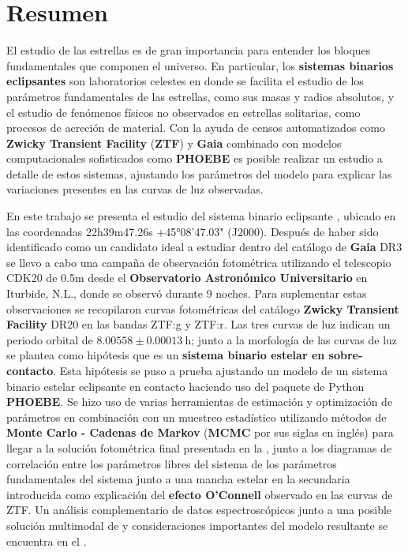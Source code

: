 \chapter*{Resumen}

El estudio de las estrellas es de gran importancia para entender los bloques
fundamentales que componen el universo. En particular, los \textbf{sistemas
binarios eclipsantes} son laboratorios celestes en donde se facilita el estudio
de los parámetros fundamentales de las estrellas, como sus masas y radios
absolutos, y el estudio de fenómenos físicos no observados en estrellas
solitarias, como procesos de acreción de material. Con la ayuda de censos
automatizados como \textbf{Zwicky Transient Facility} (\textbf{ZTF}) y
\textbf{Gaia} combinado con modelos computacionales sofisticados como
\textbf{PHOEBE} es posible realizar un estudio a detalle de estos sistemas,
ajustando los parámetros del modelo para explicar las variaciones presentes en
las curvas de luz observadas. 

En este trabajo se presenta el estudio del sistema binario eclipsante
\textbf{\atoObjIdNoSpace}, ubicado en las coordenadas 22h39m47.26s +45°08'47.03"
(J2000). Después de haber sido identificado como un candidato ideal a estudiar
dentro del catálogo de \textbf{Gaia} DR3 se llevo a cabo una campaña de
observación fotométrica utilizando el telescopio CDK20 de 0.5m desde el
\textbf{Observatorio Astronómico Universitario} en Iturbide, N.L., donde se
observó \atoObjId durante 9 noches. Para suplementar estas observaciones se
recopilaron curvas fotométricas del catálogo \textbf{Zwicky Transient Facility}
DR20 en las bandas ZTF:g y ZTF:r. Las tres curvas de luz indican un periodo
orbital de  $8.00558 \pm 0.00013 \ \mathrm{h}$; junto a la morfología de las
curvas de luz se plantea como hipótesis que \atoObjId es un \textbf{sistema
binario estelar en sobre-contacto}. Esta hipótesis se puso a prueba ajustando un
modelo de un sistema binario estelar eclipsante en contacto haciendo uso del
paquete de Python \textbf{PHOEBE}. Se hizo uso de varias herramientas de
estimación y optimización de parámetros en combinación con un muestreo
estadístico utilizando métodos de \textbf{Monte Carlo - Cadenas de Markov}
(\textbf{MCMC} por sus siglas en inglés) para llegar a la solución fotométrica
final presentada en la
, junto a los
diagramas de correlación entre los parámetros libres del sistema de los
parámetros fundamentales del sistema junto a una mancha estelar en la secundaria
introducida como explicación del \textbf{efecto O'Connell} observado en las
curvas de ZTF. Un análisis complementario de datos espectroscópicos junto a una
posible solución multimodal de \atoObjId y consideraciones importantes del
modelo resultante se encuentra en el
.
